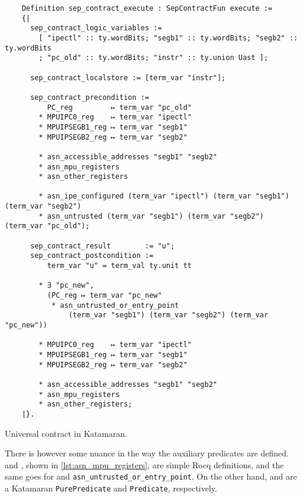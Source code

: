 \begin{listing}
  \begin{verbatim}
    Definition sep_contract_execute : SepContractFun execute :=
    {|
      sep_contract_logic_variables :=
        [ "ipectl" :: ty.wordBits; "segb1" :: ty.wordBits; "segb2" :: ty.wordBits
        ; "pc_old" :: ty.wordBits; "instr" :: ty.union Uast ];

      sep_contract_localstore := [term_var "instr"];

      sep_contract_precondition :=
          PC_reg         ↦ term_var "pc_old"
        * MPUIPC0_reg    ↦ term_var "ipectl"
        * MPUIPSEGB1_reg ↦ term_var "segb1"
        * MPUIPSEGB2_reg ↦ term_var "segb2"

        * asn_accessible_addresses "segb1" "segb2"
        * asn_mpu_registers
        * asn_other_registers

        * asn_ipe_configured (term_var "ipectl") (term_var "segb1") (term_var "segb2")
        * asn_untrusted (term_var "segb1") (term_var "segb2") (term_var "pc_old");

      sep_contract_result        := "u";
      sep_contract_postcondition :=
          term_var "u" = term_val ty.unit tt

        * ∃ "pc_new",
          (PC_reg ↦ term_var "pc_new"
           * asn_untrusted_or_entry_point
               (term_var "segb1") (term_var "segb2") (term_var "pc_new"))

        * MPUIPC0_reg    ↦ term_var "ipectl"
        * MPUIPSEGB1_reg ↦ term_var "segb1"
        * MPUIPSEGB2_reg ↦ term_var "segb2"

        * asn_accessible_addresses "segb1" "segb2"
        * asn_mpu_registers
        * asn_other_registers;
    |}.
  \end{verbatim}
  \caption{Universal contract in Katamaran.}
  \label{lst:universal-contract}
\end{listing}

There is however some nuance in the way the auxiliary predicates are defined.
 and , shown in \cref{lst:asn_mpu_registers}, are simple Rocq definitions, and the same goes for  and \texttt{asn\_un\-trust\-ed\_or\_en\-try\_point}. On the other hand,  and  are a Katamaran \texttt{Pure\-Pred\-i\-cate} and \texttt{Pred\-i\-cate}, respectively.


